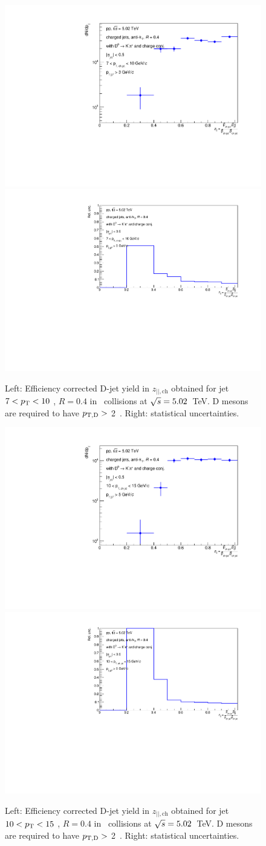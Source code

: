 \begin{figure}[bth]
\centering
\includegraphics[width=0.45\linewidth]{pp_2sig/R4_jetbin_7_10/jetPtSpectrum_SB_RebinProb_pTD3}
\includegraphics[width=0.45\linewidth]{pp_2sig/R4_jetbin_7_10/jetPtSpectrumUnc_SB_Rebin_pTD3}
\caption{Left: Efficiency corrected D-jet yield in $z_{||,\text{ch}}$ obtained for jet $7<p_{\text T}<10$ \GeVc, $R=0.4$ in \pp\ collisions at $\sqrt{s}=5.02$~TeV. D mesons are required to have $p_{\mathrm{T,D}}>$ 2~\GeVc. Right: statistical uncertainties.}
\label{fig:eq_pp_effCorr7_10_R4}
\end{figure}

\begin{figure}[bth]
\centering
\includegraphics[width=0.45\linewidth]{pp_2sig/R4_jetbin_10_15/jetPtSpectrum_SB_RebinProb_pTD5}
\includegraphics[width=0.45\linewidth]{pp_2sig/R4_jetbin_10_15/jetPtSpectrumUnc_SB_Rebin_pTD5}
\caption{Left: Efficiency corrected D-jet yield in $z_{||,\text{ch}}$ obtained for jet $10<p_{\text T}<15$ \GeVc, $R=0.4$ in \pp\ collisions at $\sqrt{s}=5.02$~TeV. D mesons are required to have $p_{\mathrm{T,D}}>$ 2~\GeVc. Right: statistical uncertainties.}
\label{fig:eq_pp_effCorr10_15_R4}
\end{figure}

